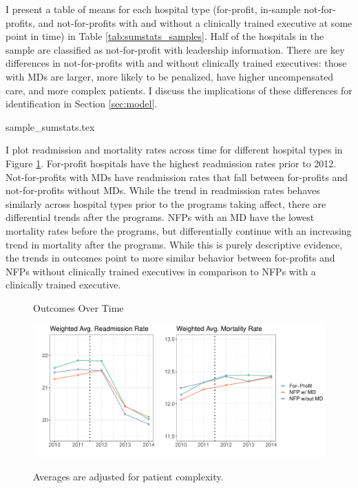 \documentclass[12pt]{article}
\begin{document}


    I present a table of means for each hospital type (for-profit, in-sample not-for-profits, and not-for-profits with and without a clinically trained executive at some point in time) in Table \ref{tab:sumstats_samples}. Half of the hospitals in the sample are classified as not-for-profit with leadership information. There are key differences in not-for-profits with and without clinically trained executives: those with MDs are larger, more likely to be penalized, have higher uncompensated care, and more complex patients. I discuss the implications of these differences for identification in Section \ref{sec:model}. 

    {sample_sumstats.tex}

    I plot readmission and mortality rates across time for different hospital types in Figure \ref{fig:weighted_read_mort_graph}. For-profit hospitals have the highest readmission rates prior to 2012. Not-for-profits with MDs have readmission rates that fall between for-profits and not-for-profits without MDs. While the trend in readmission rates behaves similarly across hospital types prior to the programs taking affect, there are differential trends after the programs. NFPs with an MD have the lowest mortality rates before the programs, but differentially continue with an increasing trend in mortality after the programs. While this is purely descriptive evidence, the trends in outcomes point to more similar behavior between for-profits and NFPs without clinically trained executives in comparison to NFPs with a clinically trained executive.

    \begin{figure}[ht!]
    \centering
        \caption{Outcomes Over Time}
        \includegraphics[width=\textwidth]{Objects/weighted_read_mort_adjusted_graph.pdf}
        \label{fig:weighted_read_mort_graph}
        \caption*{\footnotesize{Averages are adjusted for patient complexity.}}
    \end{figure}
\end{document}
